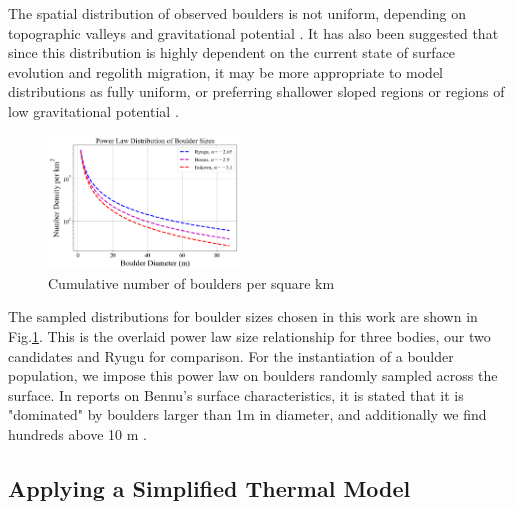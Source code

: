 The spatial distribution of observed boulders is not uniform, depending on topographic valleys and gravitational potential \citep{Jawin2020}. It has also been suggested that since this distribution is highly dependent on the current state of surface evolution and regolith migration, it may be more appropriate to model distributions as fully uniform, or preferring shallower sloped regions or regions of low gravitational potential \citep{Jawin2022}. 
\begin{figure}[H]
    \centering
    \includegraphics[width=0.45\textwidth]{fig/boulder_sizes_power_law.png}
    \caption{Cumulative number of boulders per square km}
    \label{fig:bs}
\end{figure}

\indent The sampled distributions for boulder sizes chosen in this work are shown in Fig.\ref{fig:bs}. This is the overlaid power law size relationship for three bodies, our two candidates and Ryugu for comparison. For the instantiation of a boulder population, we impose this power law on boulders randomly sampled across the surface. In reports on Bennu's surface characteristics, it is stated that it is "dominated" by boulders larger than 1m in diameter, and additionally we find hundreds above 10 m \citep{DellaGiustina2019}. 

\subsection{Applying a Simplified Thermal Model} \label{STM}


